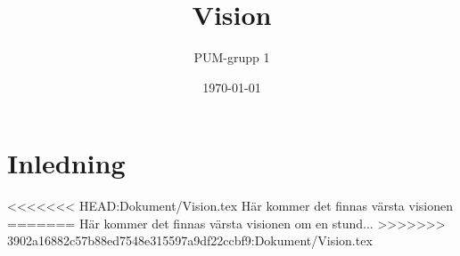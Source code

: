 

\ifpdf
\else
\fi

\title{Vision}
\author{PUM-grupp 1}
\date{\today}



\maketitle\thispagestyle{empty}

\section{Inledning}
<<<<<<< HEAD:Dokument/Vision.tex
Här kommer det finnas värsta visionen
=======
Här kommer det finnas värsta visionen om en stund...
>>>>>>> 3902a16882c57b88ed7548e315597a9df22ccbf9:Dokument/Vision.tex


